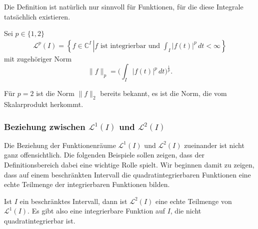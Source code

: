 Die Definition ist natürlich nur sinnvoll für Funktionen, für die diese
Integrale tatsächlich existieren.
\begin{definition}
Sei $p\in \{1,2\}$ 
\begin{align*}
\mathcal{L}^p(I)
=
\left\{ f \in \mathbb C^I \, \left|
\text{
$f$ ist integrierbar und $\int_I |f(t)|^p\,dt<\infty$
}
\right.\right\}
\end{align*}
mit zugehöriger Norm
\[
\|f\|_p = \biggl(\int_I |f(t)|^p \,dt\biggr)^{\frac1p}.
\]
\end{definition}

Für $p=2$ ist die Norm $\|f\|_2$ bereits bekannt, es ist die Norm, die
vom Skalarprodukt herkommt.

\subsubsection{Beziehung zwischen $\mathcal{L}^1(I)$ und $\mathcal{L}^2(I)$}
Die Beziehung der Funktionenräume $\mathcal{L}^1(I)$ und $\mathcal{L}^2(I)$
zueinander ist nicht ganz offensichtlich.
Die folgenden Beispiele sollen zeigen, dass der Definitionsbereich
dabei eine wichtige Rolle spielt.
Wir beginnen damit zu zeigen, dass auf einem beschränkten Intervall
die quadratintegrierbaren Funktionen eine echte Teilmenge der integrierbaren
Funktionen bilden.

\begin{lemma}
\label{fourier:l1l2}
Ist $I$ ein beschränktes Intervall, dann ist $\mathcal{L}^2(I)$ eine
echte Teilmenge von $\mathcal{L}^1(I)$.
Es gibt also eine integrierbare Funktion auf $I$, die nicht
quadratintegrierbar ist.
\end{lemma}

